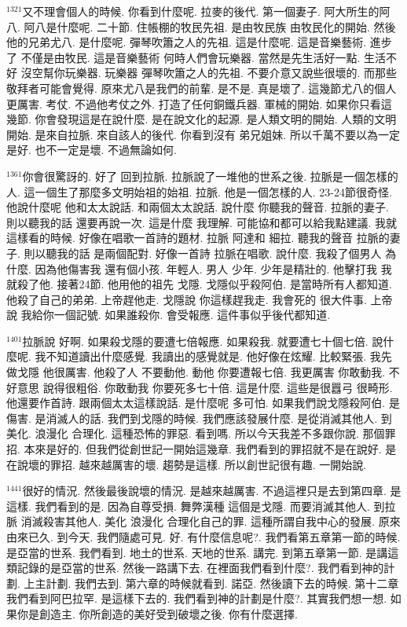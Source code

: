 \documentclass{book}
\begin{document}
$^{1321}$又不理會個人的時候.
你看到什麼呢.
拉麥的後代.
第一個妻子.
阿大所生的阿八.
阿八是什麼呢.
二十節.
住帳棚的牧民先祖.
是由牧民族 由牧民化的開始.
然後他的兄弟尤八.
是什麼呢.
彈琴吹簫之人的先祖.
這是什麼呢.
這是音樂藝術.
進步了 不僅是由牧民.
這是音樂藝術 何時人們會玩樂器.
當然是先生活好一點.
生活不好 沒空幫你玩樂器.
玩樂器 彈琴吹簫之人的先祖.
不要介意又說些很壞的.
而那些敬拜者可能會覺得.
原來尤八是我們的前輩.
是不是.
真是壞了.
這幾節尤八的個人更厲害.
考仗.
不過他考仗之外.
打造了任何銅鐵兵器.
軍械的開始.
如果你只看這幾節.
你會發現這是在說什麼.
是在說文化的起源.
是人類文明的開始.
人類的文明開始.
是來自拉脈.
來自該人的後代.
你看到沒有 弟兄姐妹.
所以千萬不要以為一定是好.
也不一定是壞.
不過無論如何.

$^{1361}$你會很驚訝的.
好了 回到拉脈.
拉脈說了一堆他的世系之後.
拉脈是一個怎樣的人.
這一個生了那麼多文明始祖的始祖.
拉脈.
他是一個怎樣的人.
23-24節很奇怪.
他說什麼呢 他和太太說話.
和兩個太太說話.
說什麼 你聽我的聲音.
拉脈的妻子.
則以聽我的話 還要再說一次.
這是什麼 我理解.
可能協和都可以給我點建議.
我就這樣看的時候.
好像在唱歌一首詩的題材.
拉脈 阿達和 細拉.
聽我的聲音 拉脈的妻子.
則以聽我的話 是兩個配對.
好像一首詩 拉脈在唱歌.
說什麼.
我殺了個男人 為什麼.
因為他傷害我 還有個小孩.
年輕人.
男人 少年.
少年是精壯的.
他擊打我 我就殺了他.
接著24節.
他用他的祖先 戈隱.
戈隱似乎殺阿伯.
是當時所有人都知道.
他殺了自己的弟弟.
上帝趕他走.
戈隱說 你這樣趕我走.
我會死的 很大件事.
上帝說 我給你一個記號.
如果誰殺你.
會受報應.
這件事似乎後代都知道.

$^{1401}$拉脈說 好啊.
如果殺戈隱的要遭七倍報應.
如果殺我.
就要遭七十個七倍.
說什麼呢.
我不知道讀出什麼感覺.
我讀出的感覺就是.
他好像在炫耀.
比較緊張.
我先做戈隱 他很厲害.
他殺了人 不要動他.
動他 你要遭報七倍.
我更厲害 你敢動我.
不好意思 說得很粗俗.
你敢動我 你要死多七十倍.
這是什麼.
這些是很囂弓 很畸形.
他還要作首詩.
跟兩個太太這樣說話.
是什麼呢 多可怕.
如果我們說戈隱殺阿伯.
是傷害.
是消滅人的話.
我們到戈隱的時候.
我們應該發展什麼.
是從消滅其他人.
到美化.
浪漫化 合理化.
這種恐怖的罪惡.
看到嗎.
所以今天我差不多跟你說.
那個罪招.
本來是好的.
但我們從創世記一開始這幾章.
我們看到的罪招就不是在說好.
是在說壞的罪招.
越來越厲害的壞.
趨勢是這樣.
所以創世記很有趣.
一開始說.

$^{1441}$很好的情況.
然後最後說壞的情況.
是越來越厲害.
不過這裡只是去到第四章.
是這樣.
我們看到的是.
因為自尊受損.
舞弊漢種 這個是戈隱.
而要消滅其他人.
到拉脈 消滅殺害其他人.
美化 浪漫化 合理化自己的罪.
這種所謂自我中心的發展.
原來由來已久.
到今天.
我們隨處可見.
好.
有什麼信息呢?.
我們看第五章第一節的時候.
是亞當的世系.
我們看到.
地土的世系.
天地的世系.
講完.
到第五章第一節.
是講這類記錄的是亞當的世系.
然後一路講下去.
在裡面我們看到什麼?.
我們看到神的計劃.
上主計劃.
我們去到.
第六章的時候就看到.
諾亞.
然後讀下去的時候.
第十二章我們看到阿巴拉罕.
是這樣下去的.
我們看到神的計劃是什麼?.
其實我們想一想.
如果你是創造主.
你所創造的美好受到破壞之後.
你有什麼選擇.
\end{document}
